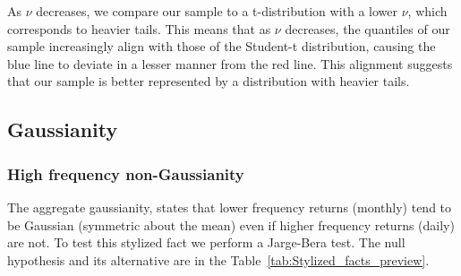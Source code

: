 \documentclass{article}
\begin{document}
\noindent As $\nu$ decreases, we compare our sample to a t-distribution with a lower $\nu$, which corresponds to heavier tails. This means that as $\nu$ decreases, the quantiles of our sample increasingly align with those of the Student-t distribution, causing the blue line to deviate in a lesser manner from the red line. This alignment suggests that our sample is better represented by a distribution with heavier tails.

\subsection{Gaussianity}
\subsubsection{High frequency non-Gaussianity}

The aggregate gaussianity, states that lower frequency returns (monthly) tend to be Gaussian (symmetric about the mean) even if higher frequency returns (daily) are not. 
To test this stylized fact we perform a Jarge-Bera test. The null hypothesis and its alternative are in the Table~\ref{tab:Stylized_facts_preview}.



 
\end{document}
